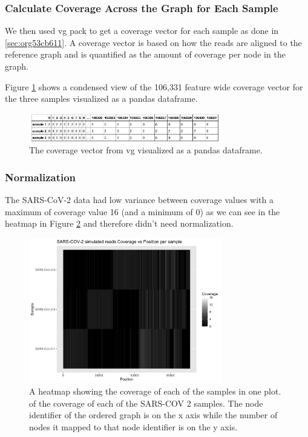 \documentclass[10pt, a4paper]{article}
\begin{document}
\subsubsection{Calculate Coverage Across the Graph for Each Sample}
\label{sec:org98106bb}
We then used vg pack to get a coverage vector for each sample as done in 
\ref{sec:org53cb611}.
A coverage vector is based on how the reads are aligned to the reference graph 
and is quantified as the amount of coverage per node in the graph.

Figure \ref{fig:org7267402} shows a condensed view of the 106,331 feature
wide coverage vector for the three samples visualized as a pandas dataframe.

\begin{figure}[h]
\centering
\includegraphics[width=0.75\textwidth]{../Figures/SARS_CoV_2/SARS_Coverage_Vector.png}
\caption[SARS-CoV-2 Coverage Vector]{\label{fig:org7267402}
The coverage vector from vg visualized as a pandas dataframe.}
\end{figure}

\subsubsection{Normalization}
\label{sec:orgca7c36f}
The SARS-CoV-2 data had low variance between coverage values with a maximum of 
coverage value 16 (and a minimum of 0) as we can see in the heatmap in Figure
\ref{fig:org1eafc94} and therefore didn’t need normalization.

\begin{figure}[h!]
\centering
\includegraphics[width=0.75\textwidth]{../Figures/SARS_CoV_2/Heatmap.png}
\caption[SARS-CoV-2 heatmap]{\label{fig:org1eafc94}
A heatmap showing the coverage of each of the samples in one plot. of the coverage of each of the SARS-COV 2 samples. The node identifier of the ordered graph is on the x axis while the number of nodes it mapped to that node identifier is on the y axis.}
\end{figure}
\end{document}
